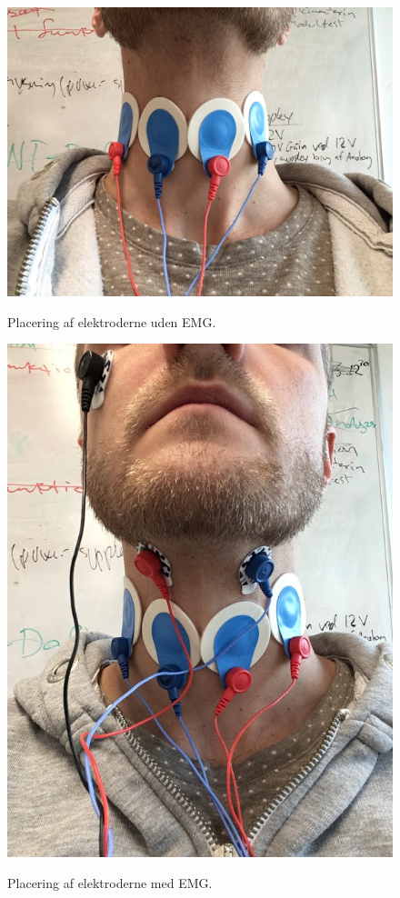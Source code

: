 \begin{figure}[H]
\centering
{\includegraphics[width=\linewidth]
{Figure/integrationstestBilleder2}}
\caption{Placering af elektroderne uden EMG.}
\label{fig:integrationstestBilleder2}
\end{figure} 


\begin{figure}[H]
\centering
{\includegraphics[width=\linewidth]
{Figure/integrationstestBilleder3}}
\caption{Placering af elektroderne med EMG.}
\label{fig:integrationstestBilleder3}
\end{figure} 

